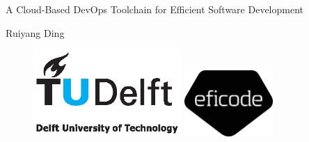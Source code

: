 \begin{titlepage}

\null\vfill

\begin{center}
\LARGE{A Cloud-Based DevOps Toolchain for Efficient Software Development}
\end{center}

\vspace{1.5cm}

\begin{center}
Ruiyang Ding
\end{center}

\vfill

\begin{figure}[!b]
\centering
\includegraphics[width={0.5\textwidth}]{pics/TUD_logo_color.eps}
\includegraphics[width={0.3\textwidth}]{pics/Eficode_logo.eps}

\end{figure}

\vspace{2.0cm}

\end{titlepage}

